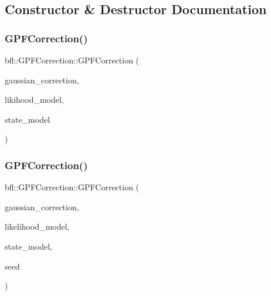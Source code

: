 \subsection{Constructor \& Destructor Documentation}
\mbox{\label{classbfl_1_1GPFCorrection_aa3dbc7bc8252895a11fcf547beb231ed}} 
\subsubsection{\texorpdfstring{G\+P\+F\+Correction()}{GPFCorrection()}\hspace{0.1cm}{\footnotesize\ttfamily [1/3]}}
{\footnotesize\ttfamily bfl\+::\+G\+P\+F\+Correction\+::\+G\+P\+F\+Correction (\begin{DoxyParamCaption}\item[{std\+::unique\+\_\+ptr$<$ \mbox{\hyperlink{classbfl_1_1GaussianCorrection}{bfl\+::\+Gaussian\+Correction}} $>$}]{gaussian\+\_\+correction,  }\item[{std\+::unique\+\_\+ptr$<$ \mbox{\hyperlink{classbfl_1_1LikelihoodModel}{bfl\+::\+Likelihood\+Model}} $>$}]{likihood\+\_\+model,  }\item[{std\+::unique\+\_\+ptr$<$ \mbox{\hyperlink{classbfl_1_1StateModel}{bfl\+::\+State\+Model}} $>$}]{state\+\_\+model }\end{DoxyParamCaption})\hspace{0.3cm}{\ttfamily [noexcept]}}

\mbox{\label{classbfl_1_1GPFCorrection_a92bf53cc6b5890e0f415de3b8f6f0d18}} 
\subsubsection{\texorpdfstring{G\+P\+F\+Correction()}{GPFCorrection()}\hspace{0.1cm}{\footnotesize\ttfamily [2/3]}}
{\footnotesize\ttfamily bfl\+::\+G\+P\+F\+Correction\+::\+G\+P\+F\+Correction (\begin{DoxyParamCaption}\item[{std\+::unique\+\_\+ptr$<$ \mbox{\hyperlink{classbfl_1_1GaussianCorrection}{bfl\+::\+Gaussian\+Correction}} $>$}]{gaussian\+\_\+correction,  }\item[{std\+::unique\+\_\+ptr$<$ \mbox{\hyperlink{classbfl_1_1LikelihoodModel}{bfl\+::\+Likelihood\+Model}} $>$}]{likelihood\+\_\+model,  }\item[{std\+::unique\+\_\+ptr$<$ \mbox{\hyperlink{classbfl_1_1StateModel}{bfl\+::\+State\+Model}} $>$}]{state\+\_\+model,  }\item[{unsigned int}]{seed }\end{DoxyParamCaption})\hspace{0.3cm}{\ttfamily [noexcept]}}

